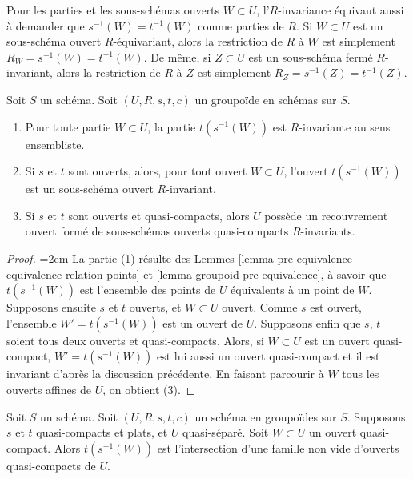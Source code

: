 \noindent
Pour les parties et les sous-schémas ouverts $W \subset U$, l'$R$-invariance
équivaut aussi à demander que $s^{-1}(W) = t^{-1}(W)$
comme parties de $R$. Si $W \subset U$ est un sous-schéma ouvert $R$-équivariant,
alors la restriction de $R$ à $W$ est simplement $R_W = s^{-1}(W) = t^{-1}(W)$.
De même, si $Z \subset U$ est un sous-schéma fermé $R$-invariant, alors
la restriction de $R$ à $Z$ est simplement $R_Z = s^{-1}(Z) = t^{-1}(Z)$.

\begin{lemma}
\label{lemma-constructing-invariant-opens}
Soit $S$ un schéma.
Soit $(U, R, s, t, c)$ un groupoïde en schémas sur $S$.
\begin{enumerate}
\item Pour toute partie $W \subset U$, la partie $t(s^{-1}(W))$
est $R$-invariante au sens ensembliste.
\item Si $s$ et $t$ sont ouverts, alors, pour tout ouvert $W \subset U$,
l'ouvert $t(s^{-1}(W))$ est un sous-schéma ouvert $R$-invariant.
\item Si $s$ et $t$ sont ouverts et quasi-compacts, alors $U$ possède un
recouvrement ouvert formé de sous-schémas ouverts quasi-compacts $R$-invariants.
\end{enumerate}
\end{lemma}

\begin{proof}
{\emergencystretch=2em La partie (1) résulte des
Lemmes \ref{lemma-pre-equivalence-equivalence-relation-points} et
\ref{lemma-groupoid-pre-equivalence}, à savoir que $t(s^{-1}(W))$
est l'ensemble des points de $U$ équivalents à un point de $W$.
Supposons ensuite $s$ et $t$ ouverts, et $W \subset U$ ouvert.
Comme $s$ est ouvert, l'ensemble $W' = t(s^{-1}(W))$ est un ouvert de $U$.
Supposons enfin que $s$, $t$ soient tous deux ouverts et quasi-compacts.
Alors, si $W \subset U$ est un ouvert quasi-compact,
$W' = t(s^{-1}(W))$ est lui aussi un ouvert quasi-compact et il est invariant d'après la
discussion précédente. En faisant parcourir à $W$ tous les ouverts affines de $U$,
on obtient (3).\par}
\end{proof}

\begin{lemma}
\label{lemma-first-observation}
Soit $S$ un schéma. Soit $(U, R, s, t, c)$ un schéma en groupoïdes sur $S$.
Supposons $s$ et $t$ quasi-compacts et plats, et $U$ quasi-séparé.
Soit $W \subset U$ un ouvert quasi-compact. Alors $t(s^{-1}(W))$
est l'intersection d'une famille non vide d'ouverts quasi-compacts de $U$.
\end{lemma}

